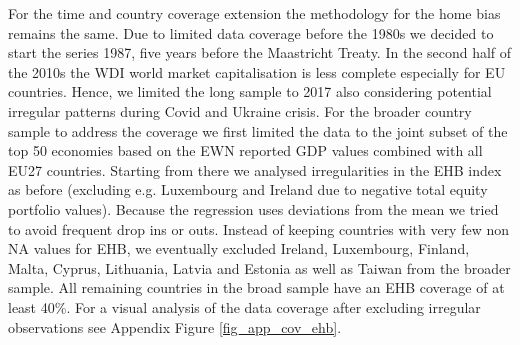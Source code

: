 \documentclass{article}
\begin{document}
For the time and country coverage extension the methodology for the home bias remains the same. Due to limited data coverage before the 1980s we decided to start the series 1987, five years before the Maastricht Treaty. In the second half of the 2010s the WDI world market capitalisation is less complete especially for EU countries. Hence, we limited the long sample to 2017 also considering potential irregular patterns during Covid and Ukraine crisis. For the broader country sample to address the coverage we first limited the data to the joint subset of the top 50 economies based on the EWN reported GDP values combined with all EU27 countries. Starting from there we analysed irregularities in the EHB index as before (excluding e.g. Luxembourg and Ireland due to negative total equity portfolio values).
Because the regression uses deviations from the mean we tried to avoid frequent drop ins or outs. Instead of keeping countries with very few non NA values for EHB, we eventually excluded Ireland, Luxembourg, Finland, Malta, Cyprus, Lithuania, Latvia and Estonia as well as Taiwan from the broader sample. All remaining countries in the broad sample have an EHB coverage of at least 40\%. For a visual analysis of the data coverage after excluding irregular observations see Appendix Figure \ref{fig_app_cov_ehb}.
\end{document}
